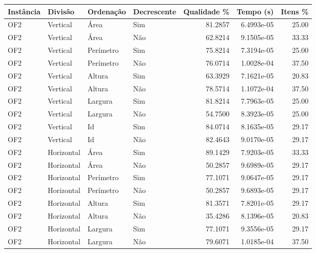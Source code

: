 \begin{tabular}{llllrrr}
    \hline
    Instância & Divisão     & Ordenação & Decrescente & Qualidade \% & Tempo (s)  & Itens \% \\
    \hline
    OF2       & Vertical    & Área      & Sim         & 81.2857      & 6.4993e-05 & 25.00    \\
    OF2       & Vertical    & Área      & Não         & 62.8214      & 9.1505e-05 & 33.33    \\
    OF2       & Vertical    & Perímetro & Sim         & 75.8214      & 7.3194e-05 & 25.00    \\
    OF2       & Vertical    & Perímetro & Não         & 76.0714      & 1.0028e-04 & 37.50    \\
    OF2       & Vertical    & Altura    & Sim         & 63.3929      & 7.1621e-05 & 20.83    \\
    OF2       & Vertical    & Altura    & Não         & 78.5714      & 1.1072e-04 & 37.50    \\
    OF2       & Vertical    & Largura   & Sim         & 81.8214      & 7.7963e-05 & 25.00    \\
    OF2       & Vertical    & Largura   & Não         & 54.7500      & 8.3923e-05 & 25.00    \\
    OF2       & Vertical    & Id        & Sim         & 84.0714      & 8.1635e-05 & 29.17    \\
    OF2       & Vertical    & Id        & Não         & 82.4643      & 9.0170e-05 & 29.17    \\
    OF2       & Horizontal  & Área      & Sim         & 89.1429      & 7.9203e-05 & 33.33    \\
    OF2       & Horizontal  & Área      & Não         & 50.2857      & 9.6989e-05 & 29.17    \\
    OF2       & Horizontal  & Perímetro & Sim         & 77.1071      & 9.0647e-05 & 29.17    \\
    OF2       & Horizontal  & Perímetro & Não         & 50.2857      & 9.6893e-05 & 29.17    \\
    OF2       & Horizontal  & Altura    & Sim         & 81.3571      & 7.8201e-05 & 29.17    \\
    OF2       & Horizontal  & Altura    & Não         & 35.4286      & 8.1396e-05 & 20.83    \\
    OF2       & Horizontal  & Largura   & Sim         & 77.1071      & 9.3556e-05 & 29.17    \\
    OF2       & Horizontal  & Largura   & Não         & 79.6071      & 1.0185e-04 & 37.50    \\

\end{tabular}
